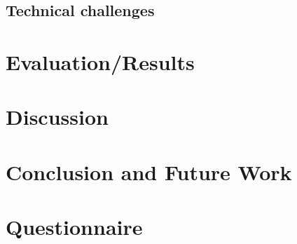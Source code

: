 \subsection{Technical challenges}


\section{Evaluation/Results}


\section{Discussion}



\section{Conclusion and Future Work}






\appendix
\section{Questionnaire}


